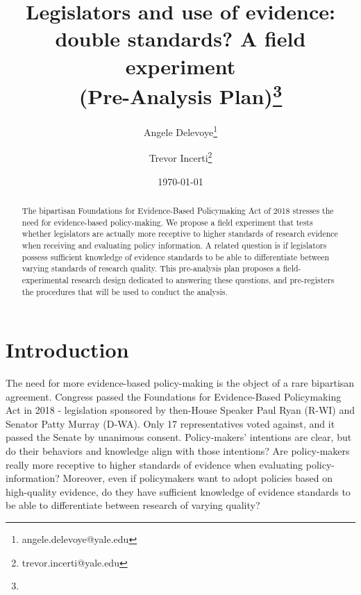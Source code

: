 \documentclass[12pt,final,fleqn]{article}
\theoremstyle{plain}
\begin{document}
\singlespace
\title{\textbf{Legislators and use of evidence: double standards? A field experiment \\
(Pre-Analysis Plan)}\vspace{-1ex}\thanks{}}
\author{Angele Delevoye\thanks{angele.delevoye@yale.edu}\vspace{-1ex}}
\author{Trevor Incerti\thanks{trevor.incerti@yale.edu}\vspace{-1ex}}
\date{\today}
\maketitle

\begin{abstract}
\noindent
The bipartisan Foundations for Evidence-Based Policymaking Act of 2018 stresses the need for evidence-based policy-making. We propose a field experiment that tests whether legislators are actually more receptive to higher standards of research evidence when receiving and evaluating policy information. A related question is if legislators possess sufficient knowledge of evidence standards to be able to differentiate between varying standards of research quality. This pre-analysis plan proposes a field-experimental research design dedicated to answering these questions, and pre-registers the procedures that will be used to conduct the analysis.
\end{abstract}

\pagebreak

\doublespace

\begin{center}
\end{center}

\section{Introduction} \label{sec:Introduction}

The need for more evidence-based policy-making is the object of a rare bipartisan agreement. Congress passed the Foundations for Evidence-Based Policymaking Act in 2018 - legislation sponsored by then-House Speaker Paul Ryan (R-WI) and Senator Patty Murray (D-WA). Only 17 representatives voted against, and it passed the Senate by unanimous consent. Policy-makers' intentions are clear, but do their behaviors and knowledge align with those intentions? Are policy-makers really more receptive to higher standards of evidence when evaluating policy-information? Moreover, even if policymakers want to adopt policies based on high-quality evidence, do they have sufficient knowledge of evidence standards to be able to differentiate between research of varying quality? 
\end{document}
